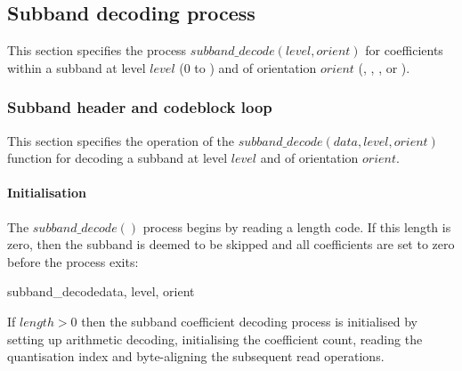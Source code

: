 \subsection{Subband decoding process}

\label{subbanddecodeprocess}

This section specifies the process $subband\_decode(level,orient)$ for coefficients
within a subband at level $level$ ($0$ to \TransformDepth) and of orientation $orient$
(\LL, \LH, \HL, or \HH). 

\subsubsection{Subband header and codeblock loop}

This section specifies the operation of the $subband\_decode(data, level, orient)$
function for decoding a subband at level $level$ and of orientation $orient$.

\paragraph{Initialisation\newline}

The $subband\_decode()$ process begins by reading a length code. If this length is
zero, then the subband is deemed to be skipped and all coefficients are set to zero
before the process exits:

\begin{pseudo}{subband\_decode}{data, level, orient}
    \bsEND
  \bsEND
  \bsRET{}
\bsEND
\bsCODE{\hdots}
\end{pseudo}

If $length>0$ then the subband coefficient decoding process is initialised by
setting up arithmetic decoding, initialising the coefficient count, reading
the quantisation index and byte-aligning the subsequent read operations.

\begin{pseudo*}
\bsCODE{\hdots}
\bsEND
\bsCODE{\hdots}
\end{pseudo*}

